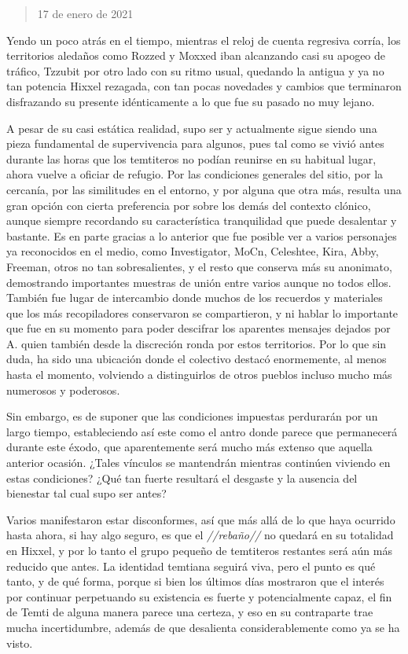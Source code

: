 \documentclass[
  spanish,
]{book}
\begin{document}
\begin{quote}
17 de enero de 2021
\end{quote}

Yendo un poco atrás en el tiempo, mientras el reloj de cuenta regresiva corría, los territorios aledaños como Rozzed y Moxxed iban alcanzando casi su apogeo de tráfico, Tzzubit por otro lado con su ritmo usual, quedando la antigua y ya no tan potencia Hixxel rezagada, con tan pocas novedades y cambios que terminaron disfrazando su presente idénticamente a lo que fue su pasado no muy lejano.

A pesar de su casi estática realidad, supo ser y actualmente sigue siendo una pieza fundamental de supervivencia para algunos, pues tal como se vivió antes durante las horas que los temtiteros no podían reunirse en su habitual lugar, ahora vuelve a oficiar de refugio. Por las condiciones generales del sitio, por la cercanía, por las similitudes en el entorno, y por alguna que otra más, resulta una gran opción con cierta preferencia por sobre los demás del contexto clónico, aunque siempre recordando su característica tranquilidad que puede desalentar y bastante. Es en parte gracias a lo anterior que fue posible ver a varios personajes ya reconocidos en el medio, como Investigator, MoCn, Celeshtee, Kira, Abby, Freeman, otros no tan sobresalientes, y el resto que conserva más su anonimato, demostrando importantes muestras de unión entre varios aunque no todos ellos. También fue lugar de intercambio donde muchos de los recuerdos y materiales que los más recopiladores conservaron se compartieron, y ni hablar lo importante que fue en su momento para poder descifrar los aparentes mensajes dejados por A. quien también desde la discreción ronda por estos territorios. Por lo que sin duda, ha sido una ubicación donde el colectivo destacó enormemente, al menos hasta el momento, volviendo a distinguirlos de otros pueblos incluso mucho más numerosos y poderosos.

Sin embargo, es de suponer que las condiciones impuestas perdurarán por un largo tiempo, estableciendo así este como el antro donde parece que permanecerá durante este éxodo, que aparentemente será mucho más extenso que aquella anterior ocasión. ¿Tales vínculos se mantendrán mientras continúen viviendo en estas condiciones? ¿Qué tan fuerte resultará el desgaste y la ausencia del bienestar tal cual supo ser antes?

Varios manifestaron estar disconformes, así que más allá de lo que haya ocurrido hasta ahora, si hay algo seguro, es que el \emph{//rebaño//} no quedará en su totalidad en Hixxel, y por lo tanto el grupo pequeño de temtiteros restantes será aún más reducido que antes. La identidad temtiana seguirá viva, pero el punto es qué tanto, y de qué forma, porque si bien los últimos días mostraron que el interés por continuar perpetuando su existencia es fuerte y potencialmente capaz, el fin de Temti de alguna manera parece una certeza, y eso en su contraparte trae mucha incertidumbre, además de que desalienta considerablemente como ya se ha visto.
\end{document}
